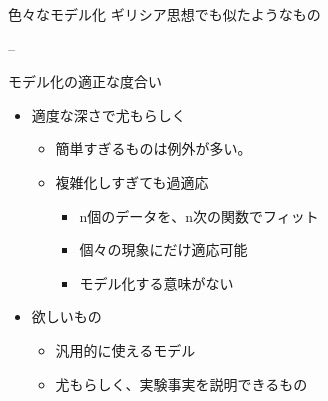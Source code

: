 \begin{frame}
\begin{block}{色々なモデル化}
ギリシア思想でも似たようなもの

--

\end{block}

\begin{block}{モデル化の適正な度合い}

\begin{itemize}
\tightlist
\item
  適度な深さで尤もらしく

  \begin{itemize}
  \tightlist
  \item
    簡単すぎるものは例外が多い。
  \item
    複雑化しすぎても過適応

    \begin{itemize}
    \tightlist
    \item
      n個のデータを、n次の関数でフィット\\
    \item
      個々の現象にだけ適応可能
    \item
      モデル化する意味がない
    \end{itemize}
  \end{itemize}
\item
  欲しいもの

  \begin{itemize}
  \tightlist
  \item
    汎用的に使えるモデル
  \item
    尤もらしく、実験事実を説明できるもの
  \end{itemize}
\end{itemize}

\end{block}

\end{frame}

